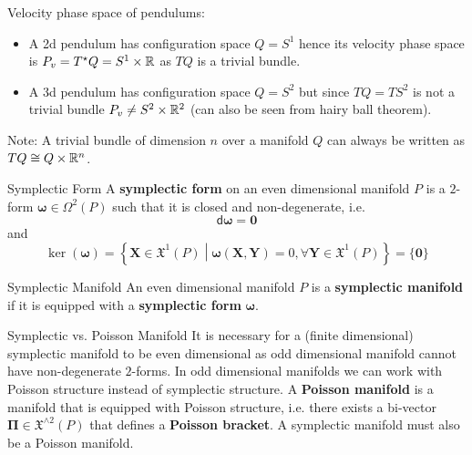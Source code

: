 \documentclass{beamer}
\begin{document}
\begin{frame}{}
  \begin{example}
    Velocity phase space of pendulums:
    \begin{itemize}
      \item A 2d pendulum has configuration space \(Q = S ^{1}\) hence its velocity phase space is \(P _{v} = T ^{\star} Q = S ^{1} \times \mathbb{R}\) as \(T Q\) is a trivial bundle.
      \item A 3d pendulum has configuration space \(Q = S ^{2}\) but since \(T Q = T S ^{2}\) is not a trivial bundle \(P _{v} \neq S ^{2} \times \mathbb{R} ^{2}\) (can also be seen from hairy ball theorem).
    \end{itemize}
    Note: A trivial bundle of dimension \(n\) over a manifold \(Q\) can always be written as \(T Q \cong Q \times \mathbb{R} ^{n}\).
  \end{example}
\end{frame}

\begin{frame}{}
  \begin{block}{Symplectic Form}
    A \textbf{symplectic form} on an even dimensional manifold \(P\) is a \(2\)-form \(\boldsymbol{\omega} \in \Omega ^{2} (P)\) such that it is closed and non-degenerate, i.e.
    \begin{equation}
      \mathsf{d} \boldsymbol{\omega} = \boldsymbol{0}
    \end{equation}
    and
    \begin{equation}
      \ker(\boldsymbol{\omega}) = \left\{ \boldsymbol{X} \in \mathfrak{X} ^{1} (P) \middle| \boldsymbol{\omega} (\boldsymbol{X}, \boldsymbol{Y}) = 0, \forall \boldsymbol{Y} \in \mathfrak{X} ^{1} (P) \right\} = \{\boldsymbol{0}\}
    \end{equation}
  \end{block}
  \begin{block}{Symplectic Manifold}
    An even dimensional manifold \(P\) is a \textbf{symplectic manifold} if it is equipped with a \textbf{symplectic form} \(\boldsymbol{\omega}\).
  \end{block}
\end{frame}

\begin{frame}{}
  \begin{alertblock}{Symplectic vs. Poisson Manifold}
    It is necessary for a (finite dimensional) symplectic manifold to be even dimensional as odd dimensional manifold cannot have non-degenerate \(2\)-forms. In odd dimensional manifolds we can work with Poisson structure instead of symplectic structure. A \textbf{Poisson manifold} is a manifold that is equipped with Poisson structure, i.e. there exists a bi-vector \(\boldsymbol{\Pi} \in \mathfrak{X} ^{\wedge 2} (P)\) that defines a \textbf{Poisson bracket}. A symplectic manifold must also be a Poisson manifold.
  \end{alertblock}
\end{frame}
\end{document}

